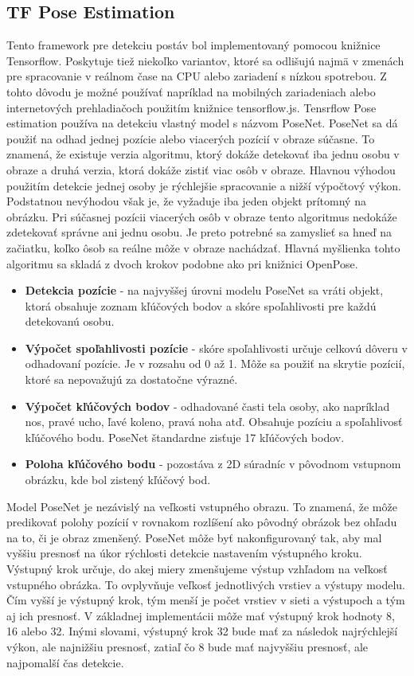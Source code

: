 \documentclass[slovak,master,dept460,male,cpp,cpdeclaration]{diploma}
\begin{document}
\newpage
\subsection{TF Pose Estimation}
Tento framework pre detekciu postáv bol implementovaný pomocou knižnice Tensorflow. Poskytuje tiež niekoľko variantov, ktoré sa odlišujú najmä v zmenách pre spracovanie v reálnom čase na CPU alebo zariadení s nízkou spotrebou. Z tohto dôvodu je  možné používať napríklad na mobilných zariadeniach alebo internetových prehladiačoch použitím knižnice tensorflow.js. Tensrflow Pose estimation používa na detekciu  vlastný model s názvom PoseNet. PoseNet sa dá použiť na odhad jednej pozície alebo viacerých pozícií  v obraze súčasne. To znamená, že existuje verzia algoritmu, ktorý dokáže detekovať iba jednu osobu v obraze a druhá verzia, ktorá dokáže zistiť viac osôb v obraze. Hlavnou výhodou použitím detekcie jednej osoby je rýchlejšie spracovanie   a nižší výpočtový výkon. Podstatnou nevýhodou však je, že vyžaduje iba jeden objekt prítomný na obrázku. Pri súčasnej pozícii viacerých osôb v obraze tento algoritmus nedokáže zdetekovať správne ani jednu osobu. Je preto potrebné sa zamyslieť sa  hneď na začiatku, koľko ôsob sa reálne môže v obraze nachádzať. Hlavná myšlienka tohto algoritmu sa skladá z dvoch krokov podobne ako pri knižnici OpenPose.

\begin{itemize}
\item \textbf{Detekcia pozície} - na najvyššej úrovni modelu PoseNet sa vráti objekt, ktorá obsahuje zoznam kľúčových bodov a skóre spoľahlivosti pre každú detekovanú osobu.
\item \textbf{Výpočet spoľahlivosti pozície} - skóre spoľahlivosti určuje celkovú dôveru v odhadovaní pozície. Je v rozsahu od 0 až 1. Môže sa použiť na skrytie pozícií, ktoré sa nepovažujú za dostatočne výrazné.
\item \textbf{Výpočet kľúčových bodov} - odhadované časti tela osoby, ako napríklad nos, pravé ucho, ľavé koleno, pravá noha atď. Obsahuje pozíciu a spoľahlivosť kľúčového bodu. PoseNet štandardne zisťuje 17 kľúčových bodov.
\item \textbf{Poloha kľúčového bodu} - pozostáva z 2D súradníc  v pôvodnom vstupnom obrázku, kde bol zistený kľúčový bod.
\end{itemize}


Model PoseNet je nezávislý na veľkosti vstupného obrazu. To znamená, že môže predikovať polohy pozícií v rovnakom rozlíšení ako pôvodný obrázok bez ohľadu na to, či je obraz zmenšený. PoseNet môže byť nakonfigurovaný tak, aby mal vyššiu presnosť na úkor rýchlosti detekcie nastavením výstupného kroku. Výstupný krok určuje, do akej miery zmenšujeme výstup vzhľadom na veľkosť vstupného obrázka. To ovplyvňuje veľkosť jednotlivých vrstiev a výstupy modelu. Čím vyšší je výstupný krok, tým menší je počet vrstiev v sieti a výstupoch a tým aj ich presnosť. V základnej implementácii môže mať výstupný krok hodnoty 8, 16 alebo 32. Inými slovami, výstupný krok 32 bude mať za následok najrýchlejší výkon, ale najnižšiu presnosť, zatiaľ čo 8 bude mať najvyššiu presnosť, ale najpomalší čas detekcie.
\end{document}
